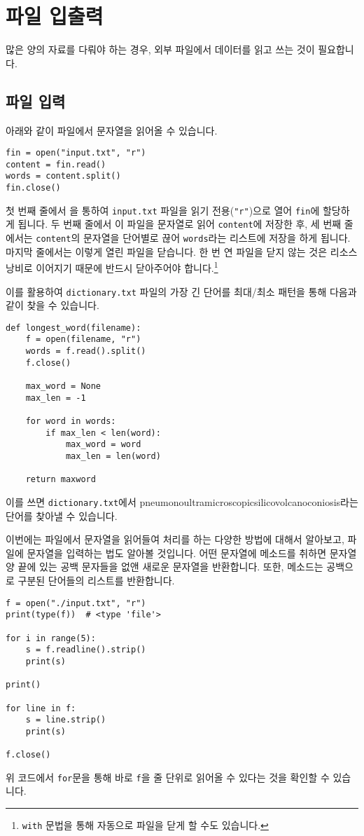 \documentclass[../main.tex]{subfiles}
\begin{document}
\section{파일 입출력}
많은 양의 자료를 다뤄야 하는 경우, 외부 파일에서 데이터를 읽고 쓰는 것이 필요합니다.

\subsection{파일 입력}
아래와 같이 파일에서 문자열을 읽어올 수 있습니다.
\begin{verbatim}
fin = open("input.txt", "r")
content = fin.read()
words = content.split()
fin.close()
\end{verbatim}
첫 번째 줄에서 을 통하여 \texttt{input.txt} 파일을 읽기 전용(\texttt{"r"})으로 열어 \texttt{fin}에 할당하게 됩니다.
두 번째 줄에서 이 파일을 문자열로 읽어 \texttt{content}에 저장한 후, 세 번째 줄에서는 \texttt{content}의 문자열을 단어별로 끊어 \texttt{words}라는 리스트에 저장을 하게 됩니다.
마지막 줄에서는 이렇게 열린 파일을 닫습니다.
한 번 연 파일을 닫지 않는 것은 리소스 낭비로 이어지기 때문에 반드시 닫아주어야 합니다.\footnote{\texttt{with} 문법을 통해 자동으로 파일을 닫게 할 수도 있습니다.}

이를 활용하여 \texttt{dictionary.txt} 파일의 가장 긴 단어를 최대/최소 패턴을 통해 다음과 같이 찾을 수 있습니다.
\begin{verbatim}
def longest_word(filename):
    f = open(filename, "r")
    words = f.read().split()
    f.close()

    max_word = None
    max_len = -1

    for word in words:
        if max_len < len(word):
            max_word = word
            max_len = len(word)

    return maxword
\end{verbatim}
이를 쓰면 \verb/dictionary.txt/에서 pneumonoultramicroscopicsilicovolcanoconiosis라는 단어를 찾아낼 수 있습니다.

이번에는 파일에서 문자열을 읽어들여 처리를 하는 다양한 방법에 대해서 알아보고, 파일에 문자열을 입력하는 법도 알아볼 것입니다.
어떤 문자열에  메소드를 취하면 문자열 양 끝에 있는 공백 문자들을 없앤 새로운 문자열을 반환합니다.
또한,  메소드는 공백으로 구분된 단어들의 리스트를 반환합니다.
\begin{verbatim}
f = open("./input.txt", "r")
print(type(f))  # <type 'file'>

for i in range(5):
    s = f.readline().strip()
    print(s)

print()

for line in f:
    s = line.strip()
    print(s)

f.close()
\end{verbatim}
위 코드에서 \texttt{for}문을 통해 바로 \texttt{f}을 줄 단위로 읽어올 수 있다는 것을 확인할 수 있습니다.
\end{document}
